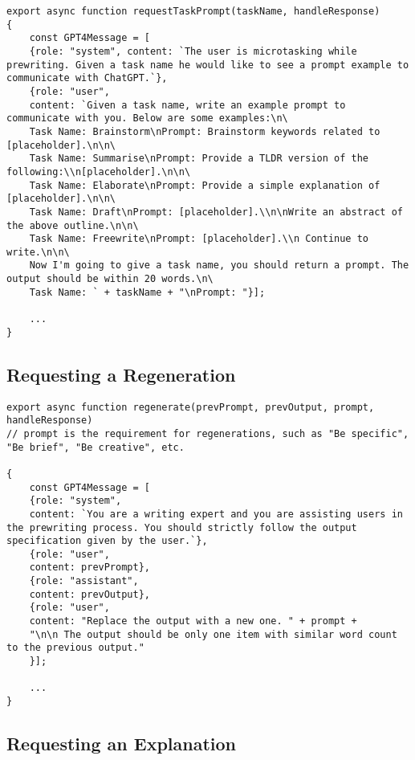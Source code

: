 \begin{verbatim}
export async function requestTaskPrompt(taskName, handleResponse)
{
    const GPT4Message = [
    {role: "system", content: `The user is microtasking while prewriting. Given a task name he would like to see a prompt example to communicate with ChatGPT.`},
    {role: "user",
    content: `Given a task name, write an example prompt to communicate with you. Below are some examples:\n\
    Task Name: Brainstorm\nPrompt: Brainstorm keywords related to [placeholder].\n\n\
    Task Name: Summarise\nPrompt: Provide a TLDR version of the following:\\n[placeholder].\n\n\
    Task Name: Elaborate\nPrompt: Provide a simple explanation of [placeholder].\n\n\
    Task Name: Draft\nPrompt: [placeholder].\\n\nWrite an abstract of the above outline.\n\n\
    Task Name: Freewrite\nPrompt: [placeholder].\\n Continue to write.\n\n\
    Now I'm going to give a task name, you should return a prompt. The output should be within 20 words.\n\
    Task Name: ` + taskName + "\nPrompt: "}];

    ...
}
\end{verbatim}

\label{appendix_feedback}
\subsection{Requesting a Regeneration}

\begin{verbatim}
export async function regenerate(prevPrompt, prevOutput, prompt, handleResponse)
// prompt is the requirement for regenerations, such as "Be specific", "Be brief", "Be creative", etc.

{
    const GPT4Message = [
    {role: "system",
    content: `You are a writing expert and you are assisting users in the prewriting process. You should strictly follow the output specification given by the user.`},
    {role: "user",
    content: prevPrompt},
    {role: "assistant",
    content: prevOutput},
    {role: "user",
    content: "Replace the output with a new one. " + prompt +
    "\n\n The output should be only one item with similar word count to the previous output."
    }];

    ...
}
\end{verbatim}

\subsection{Requesting an Explanation}

